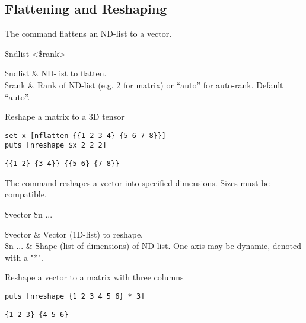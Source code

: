 \subsection{Flattening and Reshaping}
The command  flattens an ND-list to a vector.
\begin{syntax}
 \$ndlist <\$rank>
\end{syntax}
\begin{args}
\$ndlist & ND-list to flatten. \\
\$rank & Rank of ND-list (e.g. 2 for matrix) or ``auto'' for auto-rank. Default ``auto''.
\end{args}
\begin{example}{Reshape a matrix to a 3D tensor}
\begin{lstlisting}
set x [nflatten {{1 2 3 4} {5 6 7 8}}]
puts [nreshape $x 2 2 2]
\end{lstlisting}
\tcblower
\begin{lstlisting}
{{1 2} {3 4}} {{5 6} {7 8}}
\end{lstlisting}
\end{example}

The command  reshapes a vector into specified dimensions.
Sizes must be compatible.
\begin{syntax}
 \$vector \$n ...
\end{syntax}
\begin{args}
\$vector & Vector (1D-list) to reshape. \\
\$n ... & Shape (list of dimensions) of ND-list. One axis may be dynamic, denoted with a "*".
\end{args}
\begin{example}{Reshape a vector to a matrix with three columns}
\begin{lstlisting}
puts [nreshape {1 2 3 4 5 6} * 3]
\end{lstlisting}
\tcblower
\begin{lstlisting}
{1 2 3} {4 5 6}
\end{lstlisting}
\end{example}


\clearpage

